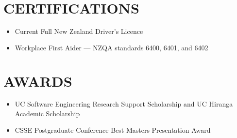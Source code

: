 \documentclass[11pt, a4paper]{article}
\begin{document}
\section{CERTIFICATIONS}

\begin{itemize}
  \item Current Full New Zealand Driver's Licence
  \item Workplace First Aider — NZQA standards 6400, 6401, and 6402
\end{itemize}

\section{AWARDS}

\begin{itemize}
  \item UC Software Engineering Research Support Scholarship and UC Hiranga Academic
        Scholarship
  \item CSSE Postgraduate Conference Best Masters Presentation Award
\end{itemize}
\end{document}
